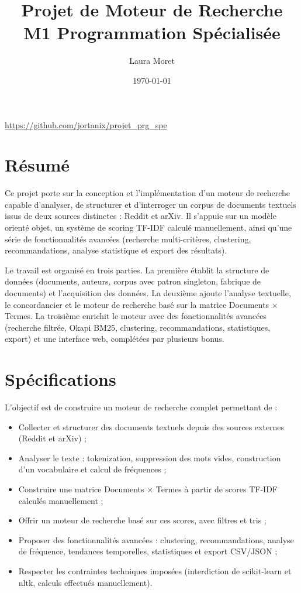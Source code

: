 \documentclass[12pt,a4paper]{article}
\title{Projet de Moteur de Recherche\\{M1 Programmation Spécialisée}}
\author{Laura Moret}
\date{\today}
\begin{document}
\maketitle
\thispagestyle{empty}

\begin{center}
\url{https://github.com/jortanix/projet_prg_spe}
\end{center}

\newpage
\tableofcontents
\newpage

\section*{Résumé}

Ce projet porte sur la conception et l'implémentation d'un moteur de recherche capable d'analyser, de structurer et d'interroger un corpus de documents textuels issus de deux sources distinctes : Reddit et arXiv. Il s'appuie sur un modèle orienté objet, un système de scoring TF-IDF calculé manuellement, ainsi qu'une série de fonctionnalités avancées (recherche multi-critères, clustering, recommandations, analyse statistique et export des résultats).

Le travail est organisé en trois parties. La première établit la structure de données (documents, auteurs, corpus avec patron singleton, fabrique de documents) et l'acquisition des données. La deuxième ajoute l'analyse textuelle, le concordancier et le moteur de recherche basé sur la matrice Documents $\times$ Termes. La troisième enrichit le moteur avec des fonctionnalités avancées (recherche filtrée, Okapi BM25, clustering, recommandations, statistiques, export) et une interface web, complétées par plusieurs bonus.

\section{Spécifications}

L'objectif est de construire un moteur de recherche complet permettant de :

\begin{itemize}
    \item Collecter et structurer des documents textuels depuis des sources externes (Reddit et arXiv) ;
    \item Analyser le texte : tokenization, suppression des mots vides, construction d'un vocabulaire et calcul de fréquences ;
    \item Construire une matrice Documents $\times$ Termes à partir de scores TF-IDF calculés manuellement ;
    \item Offrir un moteur de recherche basé sur ces scores, avec filtres et tris ;
    \item Proposer des fonctionnalités avancées : clustering, recommandations, analyse de fréquence, tendances temporelles, statistiques et export CSV/JSON ;
    \item Respecter les contraintes techniques imposées (interdiction de scikit-learn et nltk, calculs effectués manuellement).
\end{itemize}
\end{document}
